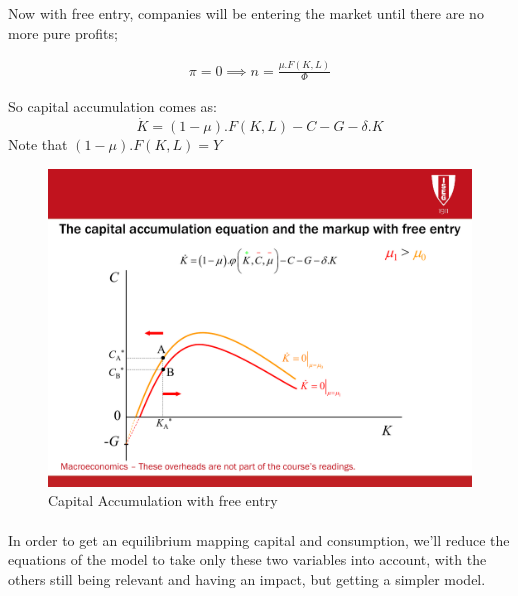 Now with free entry, companies will be entering the market until there are no more pure profits;

\begin{equation*}
    \begin{aligned}
        \pi=0 \implies n=\frac{\mu.F(K,L)}{\Phi}
    \end{aligned}
\end{equation*}

So capital accumulation comes as: 
\begin{equation*}
    \Dot{K}=(1-\mu).F(K,L)-C-G-\delta.K
\end{equation*}
Note that $(1-\mu).F(K,L)=Y$
\begin{figure}[H]
    \centering
    \includegraphics[max width=\linewidth]{5_0_The_New_Macroeconomics/Capital_accum_free_entry.pdf}
    \caption{Capital Accumulation with free entry}
    \label{Capital_Acc_free_entry}
\end{figure}

\paragraph{}
In order to get an equilibrium mapping capital and consumption, we'll reduce the equations of the model to take only these two variables into account, with the others still being relevant and having an impact, but getting a simpler model. 

